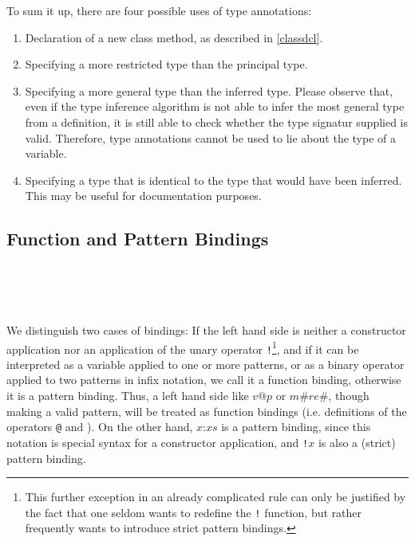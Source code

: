 To sum it up, there are four possible uses of type annotations:
\begin{enumerate}
\item Declaration of a new class method, as described in \autoref{classdcl}.
\item Specifying a more restricted type than the principal type.
\item Specifying a more general type than the inferred type. Please observe that, even if the type inference algorithm is not able to infer the most general type from a definition, it is still able to check whether the type signatur supplied is valid. Therefore, type annotations cannot be used to lie about the type of a variable.
\item Specifying a type that is identical to the type that would have been inferred. This may be useful for documentation purposes.
\end{enumerate}


\subsection{Function and Pattern Bindings} \label{binding}

\begin{flushleft}
  \\
  \oder{} \\
  
  \alt {}  \\
 \sym{=}  
  \alt {}   
\end{flushleft}

We distinguish two cases of bindings: If the left hand side is neither a constructor application nor an application of the unary operator \texttt{!}\footnote{This further exception in an already complicated rule can only be justified by the fact that one seldom wants to redefine the \texttt{!} function, but rather frequently wants to introduce strict pattern bindings.}, and if it can be interpreted as a variable applied to one or more patterns, or as a binary operator applied to two patterns in infix notation, we call it a function binding, otherwise it is a pattern binding. Thus, a left hand side like $v$@$p$ or $m$\#$re$\#, though making a valid pattern, will be treated as function bindings (i.e. definitions of the operators \texttt{@} and \texttt{}). On the other hand, $x$:$xs$ is a pattern binding, since this notation is special syntax for a constructor application, and \texttt{!}$x$ is also a (strict) pattern binding.

